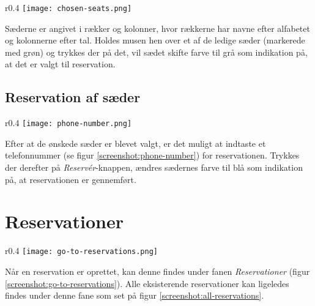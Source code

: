 \begin{wrapfigure}[4]{r}{0.4\textwidth}
  \centering
  \vspace{-12pt}
  \texttt{[image: chosen-seats.png]}
  \caption{Eksempel på valg af sæder}
  \label{screenshot:chosen-seats}
\end{wrapfigure}

Sæderne er angivet i rækker og kolonner, hvor rækkerne har navne efter alfabetet og kolonnerne efter tal. Holdes musen hen over et af de ledige sæder (markerede med grøn) og trykkes der på det, vil sædet skifte farve til grå som indikation på, at det er valgt til reservation.

\subsection{Reservation af sæder}

\begin{wrapfigure}[4]{r}{0.4\textwidth}
  \centering
  \vspace{-12pt}
  \texttt{[image: phone-number.png]}
  \caption{Et telefonnr. bliver indtastet}
  \label{screenshot:phone-number}
\end{wrapfigure}

Efter at de ønskede sæder er blevet valgt, er det muligt at indtaste et telefonnummer (se figur \ref{screenshot:phone-number}) for reservationen. Trykkes der derefter på \textit{Reservér}-knappen, ændres sædernes farve til blå som indikation på, at reservationen er gennemført.


\section{Reservationer}

\begin{wrapfigure}[3]{r}{0.4\textwidth}
  \centering
  \vspace{-12pt}
  \texttt{[image: go-to-reservations.png]}
  \caption{Gå til alle reservationer.}
  \label{screenshot:go-to-reservations}
\end{wrapfigure}

Når en reservation er oprettet, kan denne findes under fanen \textit{Reservationer} (figur \ref{screenshot:go-to-reservations}). Alle eksisterende reservationer kan ligeledes findes under denne fane som set på figur \ref{screenshot:all-reservations}.

